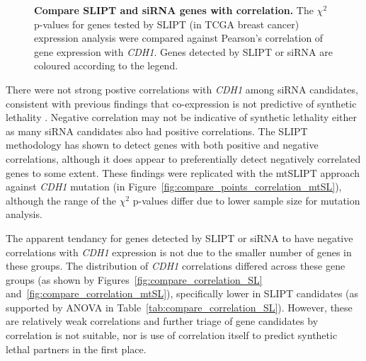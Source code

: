 \begin{figure}[!htp]
\begin{center}
   \end{center}
   \caption[Compare SLIPT and siRNA genes with correlation]{\small \textbf{Compare \gls{SLIPT} and \gls{siRNA} genes with correlation.} The $\chi^2$ p-values for genes tested by \gls{SLIPT} (in TCGA breast cancer) expression analysis were compared against Pearson's correlation of gene expression with \textit{CDH1}. Genes detected by \gls{SLIPT} or \gls{siRNA} are coloured according to the legend. 
}
\label{fig:compare_points_correlation_SL}
\end{figure}

There were not strong postive correlations with \textit{CDH1} among \gls{siRNA} candidates, consistent with previous findings that co-expression is not predictive of synthetic lethality \citep{Jerby2014, Lu2015}. Negative correlation may not be indicative of synthetic lethality either as many \gls{siRNA} candidates also had positive correlations. The \gls{SLIPT} methodology has shown to detect genes with both positive and negative correlations, although it does appear to preferentially detect negatively correlated genes to some extent. These findings were replicated with the mtSLIPT approach against \textit{CDH1} mutation (in Figure~\ref{fig:compare_points_correlation_mtSL}), although the range of the $\chi^2$ p-values differ due to lower sample size for mutation analysis.

The apparent tendancy for genes detected by \gls{SLIPT} or \gls{siRNA} to have negative correlations with \textit{CDH1} expression is not due to the smaller number of genes in these groups. The distribution of \textit{CDH1} correlations differed across these gene groups (as shown by Figures~\ref{fig:compare_correlation_SL} and~\ref{fig:compare_correlation_mtSL}), specifically lower in \gls{SLIPT} candidates (as supported by \gls{ANOVA} in Table~\ref{tab:compare_correlation_SL}). However, these are relatively weak correlations and further triage of gene candidates by correlation is not suitable, nor is use of correlation itself to predict synthetic lethal partners in the first place.


